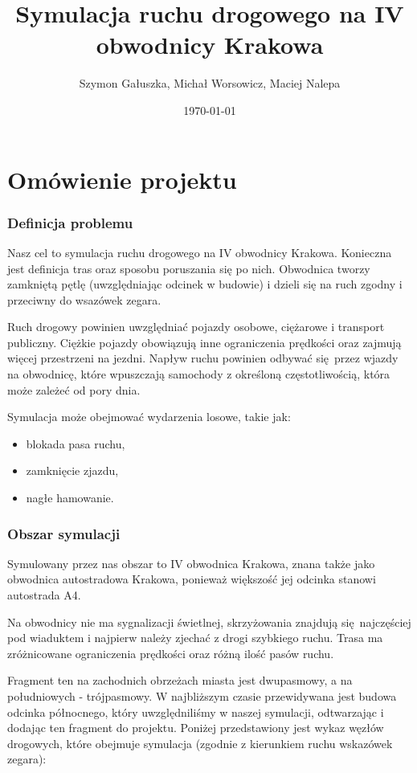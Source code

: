 \documentclass[a4paper,12pt]{article}
\title{Symulacja ruchu drogowego na IV obwodnicy Krakowa}
\author{Szymon Gałuszka, Michał Worsowicz, Maciej Nalepa}
\date{\today}
\begin{document}
    \maketitle

    \part{Omówienie projektu}

	\section{Definicja problemu}
	
	Nasz cel to symulacja ruchu drogowego na IV obwodnicy Krakowa.
	Konieczna jest definicja tras oraz sposobu poruszania się po nich.
	Obwodnica tworzy zamkniętą pętlę (uwzględniając odcinek w budowie) i dzieli się na ruch zgodny i przeciwny do wsazówek zegara.
	
	Ruch drogowy powinien uwzględniać pojazdy osobowe, ciężarowe i transport publiczny.
	Ciężkie pojazdy obowiązują inne ograniczenia prędkości oraz zajmują więcej przestrzeni na jezdni.
	Napływ ruchu powinien odbywać się przez wjazdy na obwodnicę, które wpuszczają samochody z określoną częstotliwością, która może zależeć od pory dnia.
	
	Symulacja może obejmować wydarzenia losowe, takie jak:
	
	\begin{itemize}
		\item blokada pasa ruchu,
		\item zamknięcie zjazdu,
		\item nagłe hamowanie.
    \end{itemize}
    
    \section{Obszar symulacji}
	Symulowany przez nas obszar to IV obwodnica Krakowa, znana także jako obwodnica autostradowa Krakowa, ponieważ większość jej odcinka stanowi autostrada A4.
	
	Na obwodnicy nie ma sygnalizacji świetlnej, skrzyżowania znajdują się najczęściej pod wiaduktem i najpierw należy zjechać z drogi szybkiego ruchu.
	Trasa ma zróżnicowane ograniczenia prędkości oraz różną ilość pasów ruchu.
	
	Fragment ten na zachodnich obrzeżach miasta jest dwupasmowy, a na południowych - trójpasmowy. W najbliższym czasie przewidywana jest budowa odcinka północnego, który uwzględniliśmy w naszej symulacji, odtwarzając i dodając ten fragment do projektu. Poniżej przedstawiony jest wykaz węzłów drogowych, które obejmuje symulacja (zgodnie z kierunkiem ruchu wskazówek zegara):
	
\end{document}
